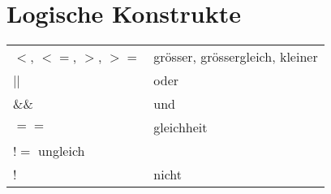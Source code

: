 \section{Logische Konstrukte}

\begin{center}
	\begin{tabular}{ ll } 
		$<$, $<=$, $>$, $>=$ & grösser, grössergleich, kleiner\\
		|| & oder\\
		\&\& & und\\
		$==$ & gleichheit\\
		$!=$ ungleich\\
		! & nicht\\
		
	\end{tabular}
\end{center}


























